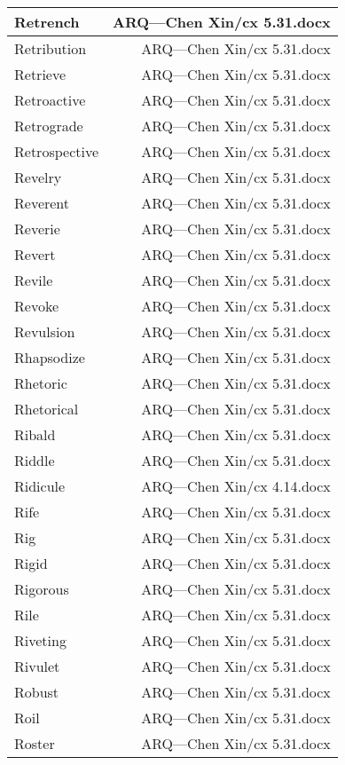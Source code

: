 \documentclass{article}
\begin{document}
\begin{center}
\begin{longtable}{|l|r|}
\hline
Retrench  &  ARQ---Chen Xin/cx 5.31.docx\\  
\hline
Retribution  &  ARQ---Chen Xin/cx 5.31.docx\\  
\hline
Retrieve  &  ARQ---Chen Xin/cx 5.31.docx\\  
\hline
Retroactive  &  ARQ---Chen Xin/cx 5.31.docx\\  
\hline
Retrograde  &  ARQ---Chen Xin/cx 5.31.docx\\  
\hline
Retrospective  &  ARQ---Chen Xin/cx 5.31.docx\\  
\hline
Revelry  &  ARQ---Chen Xin/cx 5.31.docx\\  
\hline
Reverent  &  ARQ---Chen Xin/cx 5.31.docx\\  
\hline
Reverie  &  ARQ---Chen Xin/cx 5.31.docx\\  
\hline
Revert  &  ARQ---Chen Xin/cx 5.31.docx\\  
\hline
Revile  &  ARQ---Chen Xin/cx 5.31.docx\\  
\hline
Revoke  &  ARQ---Chen Xin/cx 5.31.docx\\  
\hline
Revulsion  &  ARQ---Chen Xin/cx 5.31.docx\\  
\hline
Rhapsodize  &  ARQ---Chen Xin/cx 5.31.docx\\  
\hline
Rhetoric  &  ARQ---Chen Xin/cx 5.31.docx\\  
\hline
Rhetorical  &  ARQ---Chen Xin/cx 5.31.docx\\  
\hline
Ribald  &  ARQ---Chen Xin/cx 5.31.docx\\  
\hline
Riddle  &  ARQ---Chen Xin/cx 5.31.docx\\  
\hline
Ridicule  &  ARQ---Chen Xin/cx 4.14.docx\\  
\hline
Rife  &  ARQ---Chen Xin/cx 5.31.docx\\  
\hline
Rig  &  ARQ---Chen Xin/cx 5.31.docx\\  
\hline
Rigid  &  ARQ---Chen Xin/cx 5.31.docx\\  
\hline
Rigorous  &  ARQ---Chen Xin/cx 5.31.docx\\  
\hline
Rile  &  ARQ---Chen Xin/cx 5.31.docx\\  
\hline
Riveting  &  ARQ---Chen Xin/cx 5.31.docx\\  
\hline
Rivulet  &  ARQ---Chen Xin/cx 5.31.docx\\  
\hline
Robust  &  ARQ---Chen Xin/cx 5.31.docx\\  
\hline
Roil  &  ARQ---Chen Xin/cx 5.31.docx\\  
\hline
Roster  &  ARQ---Chen Xin/cx 5.31.docx\\  

\end{longtable}
\end{center}
\end{document}
